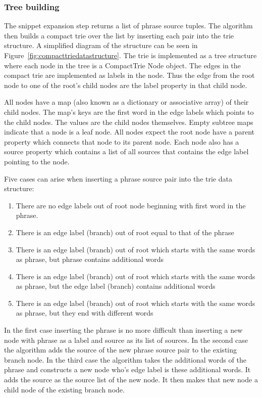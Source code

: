 \subsubsection{Tree building}
The snippet expansion step returns a list of phrase source tuples. The algorithm then builds a compact trie over the list by inserting each pair into the trie structure. A simplified diagram of the structure can be seen in Figure~\ref{fig:compacttriedatastructure}. The trie is implemented as a tree structure where each node in the tree is a CompactTrie Node object. The edges in the compact trie are implemented as labels in the node. Thus the edge from the root node to one of the root's child nodes are the label property in that child node.

All nodes have a map (also known as a dictionary or associative array) of their child nodes. The map's keys are the first word in the edge labels which points to the child nodes. The values are the child nodes themselves. Empty subtree maps indicate that a node is a leaf node. All nodes expect the root node have a parent property which connects that node to its parent node. Each node also has a source property which contains a list of all sources that contains the edge label pointing to the node.

Five cases can arise when inserting a phrase source pair into the trie data structure:
\begin{enumerate}
  \item There are no edge labels out of root node beginning with first word in the phrase.
  \item There is an edge label (branch) out of root equal to that of the phrase
  \item There is an edge label (branch) out of root which starts with the same words as phrase, but phrase contains additional words
  \item There is an edge label (branch) out of root which starts with the same words as phrase, but the edge label (branch) contains additional words
  \item There is an edge label (branch) out of root which starts with the same words as phrase, but they end with different words
\end{enumerate}
In the first case inserting the phrase is no more difficult than inserting a new node with phrase as a label and source as its list of sources. In the second case the algorithm adds the source of the new phrase source pair to the existing branch node. In the third case the algorithm takes the additional words of the phrase and constructs a new node who's edge label is these additional words. It adds the source as the source list of the new node. It then makes that new node a child node of the existing branch node.

